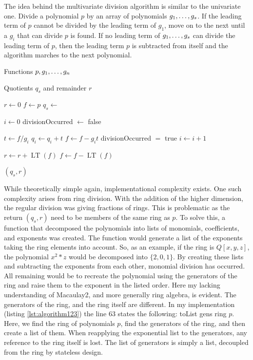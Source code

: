 The idea behind the multivariate division algorithm is similar to the univariate one. Divide a polynomial $p$ by an array of polynomials $g_1, \dots, g_s$. If the leading term of $p$ cannot be divided by the leading term of $g_1$, move on to the next until a $g_i$ that can divide $p$ is found. If no leading term of $g_1, \dots, g_s$ can divide the leading term of $p$, then the leading term $p$ is subtracted from itself and the algorithm marches to the next polynomial. 

\begin{algorithm}[ht]
\caption{Multivariate Division Algorithm}
\begin{algorithmic}[1]

\Require Functions $p,g_1, \dots, g_n$

\Ensure Quotients $q_s$ and remainder $r$

\State $r \gets 0$ 
\State $f \gets p$
\State $q_s \gets {}$ 

    \State $i \gets 0$
    \State divisionOccurred $\gets $ false

            \State $t \gets f/g_i$
            \State $q_i \gets q_i + t$
            \State $f \gets f - g_it$
            \State divisionOccurred $=$ true 
        \Else
            \State $i \gets i + 1$
        \EndIf
    \EndWhile

            \State $ r \gets r + \operatorname{LT}(f)$
            \State $ f \gets f - \operatorname{LT}(f)$
    \EndIf

\EndWhile
\State \Return $ (q_s,r)$
\end{algorithmic}
\end{algorithm}

While theoretically simple again, implementational  complexity exists. One such complexity arises from ring division. With the addition of the higher dimension, the regular division was giving fractions of rings. This is problematic as the return $(q_s,r)$ need to be members of the same ring as $p$. To solve this, a function that decomposed the polynomials into lists of monomials, coefficients, and exponents was created. The function would generate a list of the exponents taking the ring elements into account. So, as an example, if the ring is $Q[x,y,z]$, the polynomial $x^2*z$ would be decomposed into $\{2,0,1\}$. By creating these lists and subtracting the exponents from each other, monomial division has occurred. All remaining would be to recreate the polynomial using the generators of the ring and raise them to the exponent in the listed order. Here my lacking understanding of Macaulay2, and more generally ring algebra, is evident. The generators of the ring, and the ring itself are different. In my implementation (listing \ref{lst:algorithm123}) the line 63 states the following: toList gens ring $p$. Here, we find the ring of polynomials $p$, find the generators of the ring, and then create a list of them. When reapplying the exponential list to the generators, any reference to the ring itself is lost. The list of generators is simply a list, decoupled from the ring by stateless design.

